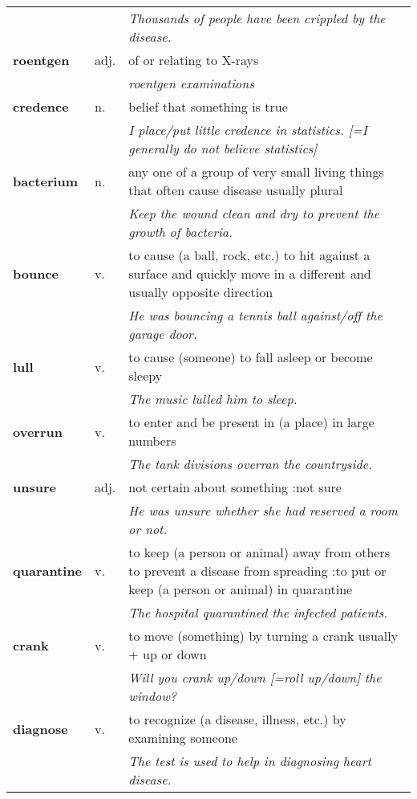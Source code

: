 \documentclass[a4paper]{article}
\begin{document}
\begin{longtable}{llp{11cm}}
 & & \textit{Thousands of people have been crippled by the disease.}\\[0.08cm]
\textbf{roentgen} & adj. &  of or relating to X-rays \\
 & & \textit{roentgen examinations}\\[0.08cm]
\textbf{credence} & n. &  belief that something is true \\
 & & \textit{I place/put little credence in statistics. [=I generally do not believe statistics]}\\[0.08cm]
\textbf{bacterium} & n. &  any one of a group of very small living things that often cause disease usually plural \\
 & & \textit{Keep the wound clean and dry to prevent the growth of bacteria.}\\[0.08cm]
\textbf{bounce} & v. &  to cause (a ball, rock, etc.) to hit against a surface and quickly move in a different and usually opposite direction \\
 & & \textit{He was bouncing a tennis ball against/off the garage door.}\\[0.08cm]
\textbf{lull} & v. &  to cause (someone) to fall asleep or become sleepy \\
 & & \textit{The music lulled him to sleep.}\\[0.08cm]
\textbf{overrun} & v. &  to enter and be present in (a place) in large numbers \\
 & & \textit{The tank divisions overran the countryside.}\\[0.08cm]
\textbf{unsure} & adj. &  not certain about something :not sure \\
 & & \textit{He was unsure whether she had reserved a room or not.}\\[0.08cm]
\textbf{quarantine} & v. &  to keep (a person or animal) away from others to prevent a disease from spreading :to put or keep (a person or animal) in quarantine \\
 & & \textit{The hospital quarantined the infected patients.}\\[0.08cm]
\textbf{crank} & v. &  to move (something) by turning a crank usually + up or down \\
 & & \textit{Will you crank up/down [=roll up/down] the window?}\\[0.08cm]
\textbf{diagnose} & v. &  to recognize (a disease, illness, etc.) by examining someone \\
 & & \textit{The test is used to help in diagnosing heart disease.}\\[0.08cm]

\end{longtable}
\end{document}
